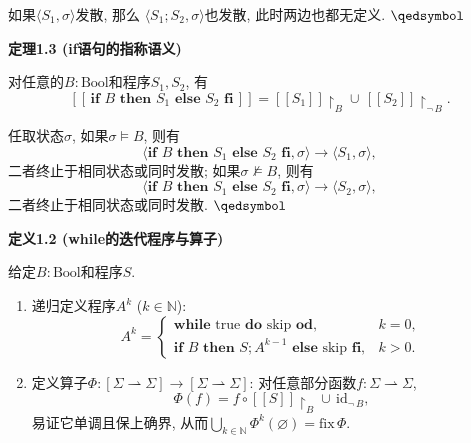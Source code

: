 \documentclass[UTF8]{ctexart}
\begin{document}
如果$\langle S_1,\sigma\rangle$发散, 那么
$\langle S_1;S_2,\sigma\rangle$也发散, 此时两边也都无定义. \hfill $\qedsymbol$

\vspace{15pt}

\hypertarget{sec:定理1.3}{}
\noindent\textbf{定理1.3 (if语句的指称语义)}

对任意的$B:\mathrm{Bool}$和程序$S_1,S_2$, 有
\[
    [\![\,\mathbf{if}\,\,B\,\,\mathbf{then}\,\,S_1\,\,\mathbf{else}\,\,S_2
    \,\,\mathbf{fi}\,]\!]=[\![S_1]\!]\!\restriction_B\cup\,
    [\![S_2]\!]\!\restriction_{\neg\,B}.
\]


任取状态$\sigma$, 如果$\sigma\models B$, 则有
\[
    \langle\mathbf{if}\,\,B\,\,\mathbf{then}\,\,S_1\,\,\mathbf{else}\,\,S_2
    \,\,\mathbf{fi},\sigma\rangle\to\langle S_1,\sigma\rangle,
\]
二者终止于相同状态或同时发散; 如果$\sigma\not\models B$, 则有
\[
    \langle\mathbf{if}\,\,B\,\,\mathbf{then}\,\,S_1\,\,\mathbf{else}\,\,S_2
    \,\,\mathbf{fi},\sigma\rangle\to\langle S_2,\sigma\rangle,
\]
二者终止于相同状态或同时发散. \hfill $\qedsymbol$

\newpage

\hypertarget{sec:定义1.2}{}
\noindent\textbf{定义1.2 (while的迭代程序与算子)}

给定$B:\mathrm{Bool}$和程序$S$.
\begin{enumerate}
    \item 递归定义程序$A^k$ ($k\in\mathbb{N}$):
    \vspace{-3pt}
    \[
        A^k=\begin{cases}
            \mathbf{while}\,\,\mathrm{true}\,\,\mathbf{do}\,\,\mathrm{skip}
            \,\,\mathbf{od}, & k=0,\\[-3pt]
            \mathbf{if}\,\,B\,\,\mathbf{then}\,\,S;A^{k-1}
            \,\,\mathbf{else}\,\,\mathrm{skip}\,\,\mathbf{fi}, & k>0.
        \end{cases}
    \]
    \item 定义算子$\Phi:[\Sigma\rightharpoonup\Sigma]\to
    [\Sigma\rightharpoonup\Sigma]$: 对任意部分函数$f:\Sigma\rightharpoonup\Sigma$,
    \[
        \Phi(f)=f\circ[\![S]\!]\!\restriction_B\cup\,\mathrm{id}_{\neg\,B},
    \]
    易证它单调且保上确界, 从而$\displaystyle
    \bigcup_{k\in\mathbb{N}}\Phi^k(\varnothing)=\mathrm{fix}\,\Phi$.
\end{enumerate}

\vspace{10pt}
\end{document}
